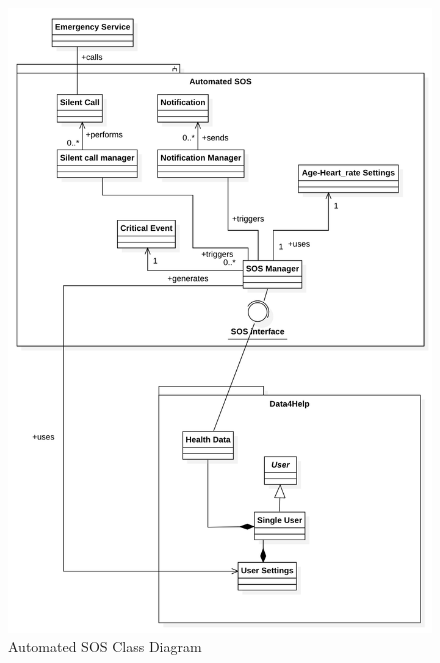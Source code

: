 \documentclass[titlepage]{article}
\begin{document}
		\begin{figure}[H]
			\center
  			\includegraphics[width=\textwidth]{Diagrammi/SOSClass.png}
  			\caption{Automated SOS Class Diagram}
 			\label{fig:SOSClass}
		\end{figure}
\end{document}
